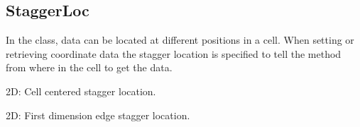 \documentclass[letterpaper,10pt,english]{sphinxmanual}
\begin{document}
\subsection{StaggerLoc}
\label{\detokenize{StaggerLoc:staggerloc}}\label{\detokenize{StaggerLoc::doc}}

\begin{fulllineitems}
\label{\detokenize{StaggerLoc:ESMF.api.constants.StaggerLoc}}
In the {\hyperref[\detokenize{grid:ESMF.api.grid.Grid}]{}} class, data can be located at different positions in a
{\hyperref[\detokenize{grid:ESMF.api.grid.Grid}]{}} cell. When setting or retrieving coordinate data the stagger
location is specified to tell the {\hyperref[\detokenize{grid:ESMF.api.grid.Grid}]{}} method from where in the
cell to get the data.

\begin{fulllineitems}
\label{\detokenize{StaggerLoc:ESMF.api.constants.StaggerLoc.CENTER}}
2D: Cell centered stagger location.

\end{fulllineitems}


\begin{fulllineitems}
\label{\detokenize{StaggerLoc:ESMF.api.constants.StaggerLoc.EDGE1}}
2D: First dimension edge stagger location.


\end{fulllineitems}
\end{fulllineitems}
\end{document}
